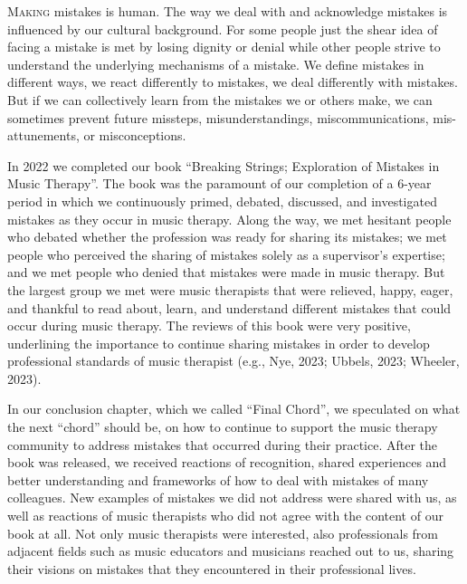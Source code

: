 \documentclass[authordate, empirical, issue]{jote-new-article}
\author[1]{\mbox{Laurien Hakvoort}}
\affil[1]{ArtEZ University of the Arts}
\author[2]{\mbox{Avi Gilboa}}
\affil[2]{Bar Ilan University}
\begin{document}
\begin{frontmatter}
  \maketitle
  \begin{abstract}
    \printabstracttext
  \end{abstract}
\end{frontmatter}





\lettrine{M}{aking} mistakes is human. The way we deal with and acknowledge mistakes is influenced by our cultural background. For some people just the shear idea of facing a mistake is met by losing dignity or denial while other people strive to understand the underlying mechanisms of a mistake. We define mistakes in different ways, we react differently to mistakes, we deal differently with mistakes. But if we can collectively learn from the mistakes we or others make, we can sometimes prevent future missteps, misunderstandings, miscommunications, mis-attunements, or misconceptions.



In 2022 we completed our book “Breaking Strings; Exploration of Mistakes in Music Therapy”. The book was the paramount of our completion of a 6-year period in which we continuously primed, debated, discussed, and investigated mistakes as they occur in music therapy. Along the way, we met hesitant people who debated whether the profession was ready for sharing its mistakes; we met people who perceived the sharing of mistakes solely as a supervisor's expertise; and we met people who denied that mistakes were made in music therapy. But the largest group we met were music therapists that were relieved, happy, eager, and thankful to read about, learn, and understand different mistakes that could occur during music therapy. The reviews of this book were very positive, underlining the importance to continue sharing mistakes in order to develop professional standards of music therapist (e.g., Nye, 2023; Ubbels, 2023; Wheeler, 2023).



In our conclusion chapter, which we called “Final Chord”, we speculated on what the next “chord” should be, on how to continue to support the music therapy community to address mistakes that occurred during their practice. After the book was released, we received reactions of recognition, shared experiences and better understanding and frameworks of how to deal with mistakes of many colleagues. New examples of mistakes we did not address were shared with us, as well as reactions of music therapists who did not agree with the content of our book at all. Not only music therapists were interested, also professionals from adjacent fields such as music educators and musicians reached out to us, sharing their visions on mistakes that they encountered in their professional lives.
\end{document}
